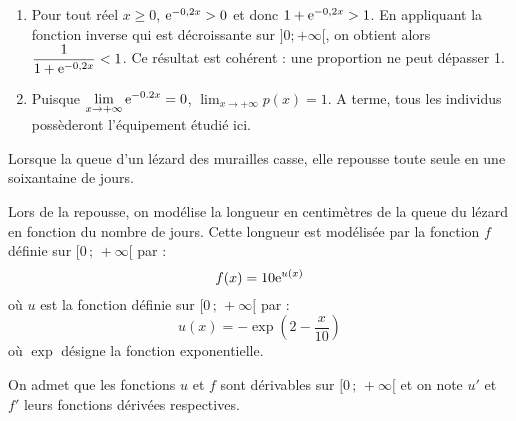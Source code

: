 \documentclass[11pt,fleqn, openany]{book} %
\begin{document}
\begin{solution}
\begin{enumerate}
\begin{enumerate}
\item Pour tout réel $x\geqslant 0$, $\mathrm{e}^{-0,2x} > 0$ et donc $1+\mathrm{e}^{-0,2x} > 1$. En appliquant la fonction inverse qui est décroissante sur $]0;+\infty[$, on obtient alors $\dfrac{1}{1+\mathrm{e}^{-0,2x}} < 1$. Ce résultat est cohérent : une proportion ne peut dépasser 1.

\item Puisque $\displaystyle\lim_{x\to+\infty}\mathrm{e}^{-0.2x}=0$, $\displaystyle\lim_{x\to+\infty}p(x)=1$. A terme, tous les individus possèderont l'équipement étudié ici.
\end{enumerate}\end{enumerate}
\end{solution}





\begin{exercise}[subtitle={(Amérique du Sud 2018)}]\hspace{0pt}
Lorsque la queue d'un lézard des murailles casse, elle repousse toute seule en une soixantaine de
jours.

Lors de la repousse, on modélise la longueur en centimètres de la queue du lézard en fonction du
nombre de jours. Cette longueur est modélisée par la fonction $f$ définie sur $[0\,;\,+\infty [$ par :
\[f(x)=10 \mathrm{e}^{u(x)}\]
où $u$ est la fonction définie sur $[0\,;\,+\infty [$ par :
\[u(x)=-\exp\left(2-\dfrac{x}{10}\right)\]
où $\exp$ désigne la fonction exponentielle.

On admet que les fonctions $u$ et $f$ sont dérivables sur $[0\,;\,+\infty [$ et on note $u'$ et $f'$ leurs fonctions dérivées respectives.


\end{exercise}
\end{document}
